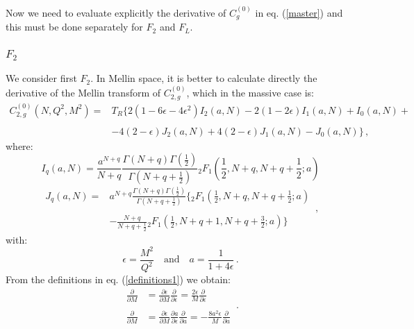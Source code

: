 \documentclass[10pt,a4paper]{article}
\begin{document}
Now we need to evaluate explicitly the derivative of $C_g^{(0)}$ in eq. (\ref{master}) and this must be done separately for $F_2$ and $F_L$. 

\subsubsection{$F_2$}

We consider first $F_2$. In Mellin space, it is better to calculate directly the derivative of the Mellin transform of $C_{2,g}^{(0)}$, which in the massive case is:
\begin{equation}
\begin{array}{rl}
\displaystyle C_{2,g}^{(0)}(N,Q^2,M^2)=&\displaystyle T_R\Big\{2(1-6\epsilon-4\epsilon^2)I_2(a,N)-2(1-2\epsilon)I_1(a,N)+I_0(a,N)+\\
\\
& \displaystyle -4(2-\epsilon)J_2(a,N)+4(2-\epsilon)J_1(a,N)-J_0(a,N)\Big\}\,,
\end{array}
\end{equation}
where:
\begin{equation}\label{iq}
I_q(a,N) = \frac{a^{N+q}}{N+q}\frac{\Gamma(N+q)\Gamma(\frac12)}{\Gamma(N+q+\frac12)} {_2F_1}\left(\frac12,N+q,N+q+\frac12;a\right)
\end{equation}
\begin{equation}\label{jq}
\begin{array}{rl}
J_q(a,N) =&\displaystyle a^{N+q}\frac{\Gamma(N+q)\Gamma(\frac12)}{\Gamma(N+q+\frac12)}\bigg\{{_2F_1}\left(\frac12,N+q,N+q+\frac12;a\right)\\
\\
&\displaystyle -\frac{N+q}{N+q+\frac12}{_2F_1}\left(\frac12,N+q+1,N+q+\frac32;a\right)\bigg\}
\end{array}\,,
\end{equation}
with:
\begin{equation}\label{definitions1}
\epsilon = \frac{M^2}{Q^2}\quad\mbox{and}\quad a=\frac1{1+4\epsilon}\,.
\end{equation}
From the definitions in eq. (\ref{definitions1}) we obtain:
\begin{equation}\label{gngngngngng}
\begin{array}{rl}
\displaystyle \frac{\partial}{\partial M} &\displaystyle = \frac{\partial \epsilon}{\partial M} \frac{\partial}{\partial \epsilon} = \frac{2\epsilon}{M}\frac{\partial}{\partial \epsilon}\\
\\
\displaystyle \frac{\partial}{\partial M} &\displaystyle = \frac{\partial \epsilon}{\partial M} \frac{\partial a}{\partial \epsilon} \frac{\partial}{\partial a} = -\frac{8a^2\epsilon}{M}\frac{\partial}{\partial a}
\end{array}\,.
\end{equation}
\end{document}
